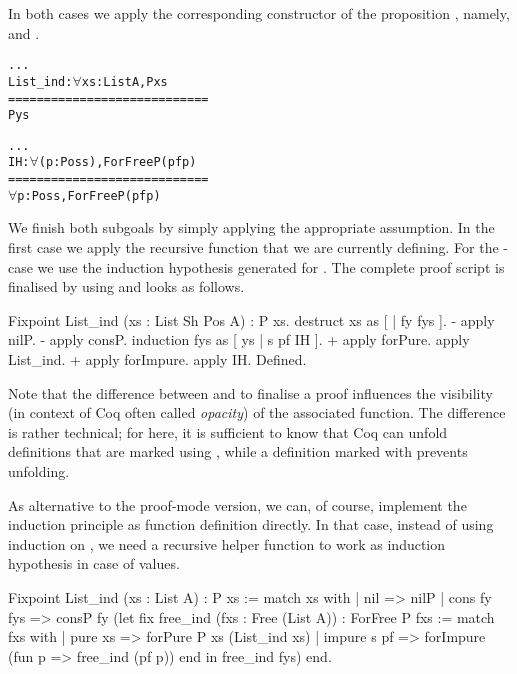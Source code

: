 In both cases we apply the corresponding constructor of the proposition , namely,  and .

\begin{alltt}
  ...
  List_ind : \(\forall\) xs : List A, P xs
  ============================
  P ys

  ...
  IH : \(\forall\) (p : Pos s), ForFree P (pf p)
  ============================
  \(\forall\) p : Pos s, ForFree P (pf p)
\end{alltt}

We finish both subgoals by simply applying the appropriate assumption.
In the first case we apply the recursive function  that we are currently defining.
For the \--case we use the induction hypothesis generated for .
The complete proof script is finalised by using  and looks as follows.

\begin{coqcode}
Fixpoint List_ind (xs : List Sh Pos A) : P xs.
 destruct xs as [ | fy fys ].
 - apply nilP.
 - apply consP.
   induction fys as [ ys | s pf IH ].
   + apply forPure.
     apply List_ind.
   + apply forImpure.
     apply IH.
Defined.
\end{coqcode}

Note that the difference between  and  to finalise a proof influences the visibility (in context of Coq often called \emph{opacity}) of the associated function.
The difference is rather technical; for here, it is sufficient to know that Coq can unfold definitions that are marked using , while a definition marked with  prevents unfolding.

As alternative to the proof\--mode version, we can, of course, implement the induction principle as function definition directly.
In that case, instead of using induction on , we need a recursive helper function  to work as induction hypothesis in case of  values.

\begin{coqcode}
Fixpoint List_ind (xs : List A) : P xs :=
 match xs with
 | nil         => nilP
 | cons fy fys =>
   consP fy (let fix free_ind (fxs : Free (List A)) : ForFree P fxs :=
                 match fxs with
                 | pure xs => forPure P xs (List_ind xs)
                 | impure s pf => forImpure (fun p => free_ind (pf p))
                 end in free_ind fys)
 end.
\end{coqcode}

